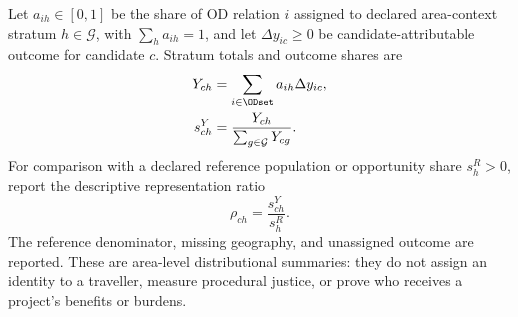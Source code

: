 Let $a_{ih}\in[0,1]$ be the share of OD relation $i$ assigned to declared
area-context stratum $h\in\mathcal{G}$, with $\sum_h a_{ih}=1$, and let
$\Delta y_{ic}\ge0$ be candidate-attributable outcome for candidate $c$.
Stratum totals and outcome shares are
\begin{align}
Y_{ch}
 &=\sum_{i\in\ODset}a_{ih}\Delta y_{ic},
\label{eq:equity-stratum-total}\\
s_{ch}^{Y}
 &=\frac{Y_{ch}}{\sum_{g\in\mathcal{G}}Y_{cg}}.
\label{eq:equity-outcome-share}
\end{align}
For comparison with a declared reference population or opportunity share
$s_h^{R}>0$, report the descriptive representation ratio
\begin{equation}
\rho_{ch}=\frac{s_{ch}^{Y}}{s_h^{R}}.
\label{eq:equity-representation-ratio}
\end{equation}
The reference denominator, missing geography, and unassigned outcome are
reported. These are area-level distributional summaries: they do not assign an
identity to a traveller, measure procedural justice, or prove who receives a
project's benefits or burdens.
